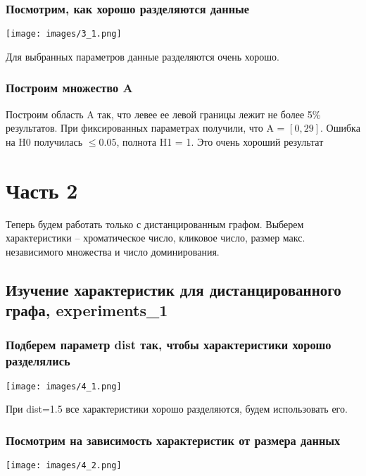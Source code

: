 \documentclass[a4paper,12pt]{article}
\begin{document}
\subsubsection*{Посмотрим, как хорошо разделяются данные}

\begin{center}
\texttt{[image: images/3\_1.png]} \end{center}

Для выбранных параметров данные разделяются очень хорошо. 

\subsubsection*{Построим множество A}
Построим область A так, что левее ее левой границы лежит не более 5\% результатов.
При фиксированных параметрах получили, что A = $[0, 29]$.
Ошибка на H0 получилась $\leq 0.05$, полнота H1 = 1. Это очень хороший результат

\section{Часть 2}
Теперь будем работать только с дистанцированным графом. Выберем характеристики -- хроматическое число, кликовое число, размер макс. независимого множества и число доминирования. 

\subsection{Изучение характеристик для дистанцированного графа, experiments\_1}

\subsubsection*{Подберем параметр dist так, чтобы характеристики хорошо разделялись}

\begin{center}
\texttt{[image: images/4\_1.png]} \end{center}

При dist=1.5 все характеристики хорошо разделяются, будем использовать его.

\subsubsection*{Посмотрим на зависимость характеристик от размера данных}

\begin{center}
\texttt{[image: images/4\_2.png]} \end{center}
\end{document}
